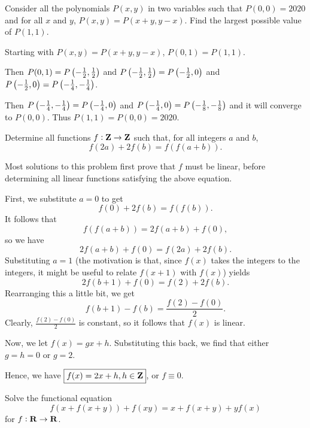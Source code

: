 \begin{prbm}
Consider all the polynomials $P(x,y)$ in two variables such that $P(0,0)=2020$ and for all $x$ and $y$, $P(x,y)=P(x+y,y-x)$. Find the largest possible value of $P(1,1)$.
\end{prbm}

\begin{solution}
Starting with $P(x,y)=P(x+y,y-x)$, $P(0,1)=P(1,1)$.

Then $P(0,1)=P\left(-\frac{1}{2},\frac{1}{2}\right)$ and $P\left(-\frac{1}{2},\frac{1}{2}\right)=P\left(-\frac{1}{2},0\right)$ and $P\left(-\frac{1}{2},0\right)=P\left(-\frac{1}{4},-\frac{1}{4}\right)$.

Then $P\left(-\frac{1}{4},-\frac{1}{4}\right)=P\left(-\frac{1}{4},0\right)$ and $P\left(-\frac{1}{4},0\right)=P\left(-\frac{1}{8},-\frac{1}{8}\right)$ and it will converge to $P(0,0)$. Thus $P(1,1)=P(0,0)=\boxed{2020}$.
\end{solution}
\pagebreak

\begin{prbm}
Determine all functions $f:\mathbf Z\to\mathbf Z$ such that, for all integers $a$ and $b$, 
\[ f(2a)+2f(b)=f(f(a+b)).\]
\end{prbm}

Most solutions to this problem first prove that $f$ must be linear, before determining all linear functions satisfying the above equation.

\begin{solution}
First, we substitute $a=0$ to get$$f(0)+2f(b)=f(f(b)).$$It follows that$$f(f(a+b))=2f(a+b)+f(0),$$so we have$$2f(a+b)+f(0)=f(2a)+2f(b).$$Substituting $a=1$ (the motivation is that, since $f(x)$ takes the integers to the integers, it might be useful to relate $f(x+1)$ with $f(x)$) yields$$2f(b+1)+f(0)=f(2)+2f(b).$$Rearranging this a little bit, we get$$f(b+1)-f(b)=\frac{f(2)-f(0)}{2}.$$Clearly, $\frac{f(2)-f(0)}{2}$ is constant, so it follows that $f(x)$ is linear.

Now, we let $f(x)=gx+h.$ Substituting this back, we find that either $g=h=0$ or $g=2.$

Hence, we have $\boxed{f(x)=2x+h,h\in\mathbf Z}$, or $\boxed{f \equiv 0}.$
\end{solution}

\begin{prbm}
Solve the functional equation
\[ f(x+f(x+y))+f(xy)=x+f(x+y)+yf(x)\]
for $f:\mathbf R\to\mathbf R$.
\end{prbm}

